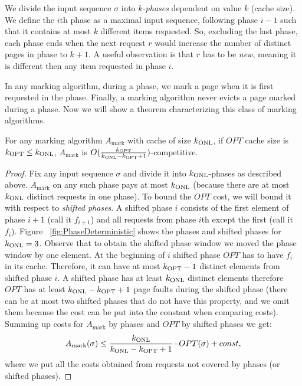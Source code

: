 We divide the input sequence $\sigma$ into $k$\textit{-phases} dependent on value $k$ 
(cache size). We define the $i$th phase as a maximal input sequence, following 
phase $i-1$ such that it contains at most $k$ different items requested. So, 
excluding the last phase, each phase ends when the next request $r$ would 
increase the number of distinct pages in phase to $k+1$. A useful observation is 
that $r$ has to be \textit{new}, meaning it is different then any item requested 
in phase $i$.


In any marking algorithm, during a phase, we mark a page when it is first 
requested in the phase. Finally, a marking algorithm
never evicts a page marked during a phase. Now we will show a theorem 
characterizing this class of marking algorithms.
\begin{theorem}\cite{torng}
For any marking algorithm $A_{\mathrm{mark}}$ with cache of size 
$k_{\mathrm{ONL}}$, if $OPT$ 
cache size is $k_{\mathrm{OPT}} \leq k_{\mathrm{ONL}}$, $A_{\mathrm{mark}}$ is 
$O(\frac{k_{\mathrm{OPT}}}{k_{\mathrm{ONL}}-k_{\mathrm{OPT}}+1})$-competitive.
\end{theorem}
\begin{proof}
Fix any input sequence $\sigma$ and divide it into $k_{\mathrm{ONL}}$-phases as described 
above. $A_{\mathrm{mark}}$ on any such phase pays at most $k_{\mathrm{ONL}}$ (because there are 
at most 
$k_{\mathrm{ONL}}$ distinct requests in one phase). To bound the $OPT$ cost, we will bound it with 
respect to \textit{shifted phases}. A shifted phase $i$ consists 
of the first element of phase $i+1$ (call it $f_{i+1}$) and all requests from phase 
$i$th except the first (call it $f_i$). Figure 
~\ref{fig:PhaseDeterministic} shows the phases and shifted phases for $k_{\mathrm{ONL}}=3$. Observe 
that to obtain the shifted phase window we moved the phase window by one element. At 
the beginning of $i$ shifted phase $OPT$ has to have $f_i$ in its cache. 
Therefore, it can have at most $k_{\mathrm{OPT}}-1$ distinct elements from shifted phase $i$. 
A shifted phase has at least $k_{\mathrm{ONL}}$ distinct elements therefore $OPT$ has at least 
$k_{\mathrm{ONL}}-k_{\mathrm{OPT}}+1$ page faults during the shifted phase (there can be at most two shifted 
phases that do not have this property, and we omit them because the cost can be put 
into the constant when comparing costs).
Summing up costs for $A_{\mathrm{mark}}$ by phases and $OPT$ by shifted phases 
we get:
$$ A_{\mathrm{mark}}(\sigma) \leq \frac{k_{\mathrm{ONL}}}{k_{\mathrm{ONL}}-k_{\mathrm{OPT}}+1} \cdot OPT(\sigma) + const,$$
where we put all the costs obtained from requests not covered by phases (or 
shifted phases).
\end{proof}
